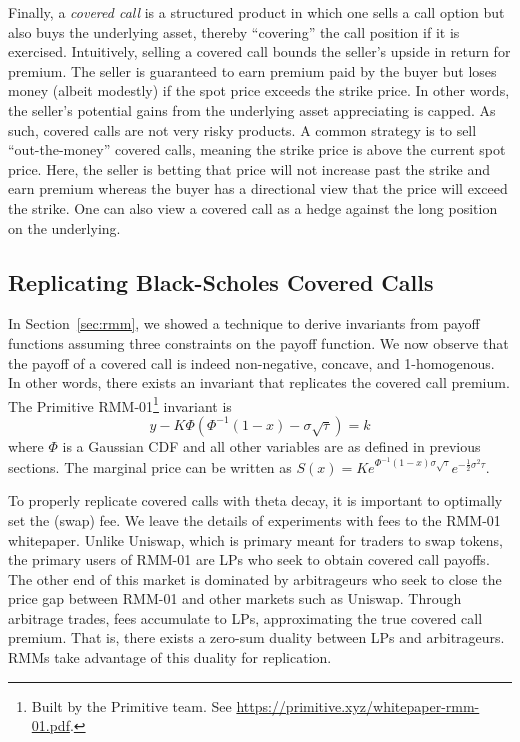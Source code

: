 \documentclass[hidelinks, 12pt]{article}
\begin{document}
Finally, a \textit{covered call} is a structured product in which one sells a call option but also buys the underlying asset, thereby ``covering'' the call position if it is exercised. Intuitively, selling a covered call bounds the seller's upside in return for premium. The seller is guaranteed to earn premium paid by the buyer but loses money (albeit modestly) if the spot price exceeds the strike price. In other words, the seller's potential gains from the underlying asset appreciating is capped. As such, covered calls are not very risky products. A common strategy is to sell ``out-the-money'' covered calls, meaning the strike price is above the current spot price. Here, the seller is betting that price will not increase past the strike and earn premium whereas the buyer has a directional view that the price will exceed the strike. One can also view a covered call as a hedge against the long position on the underlying.

\subsection{Replicating Black-Scholes Covered Calls}
\label{sec:coveredcall}

In Section~\ref{sec:rmm}, we showed a technique to derive invariants from payoff functions assuming three constraints on the payoff function. We now observe that the payoff of a covered call is indeed non-negative, concave, and 1-homogenous. In other words, there exists an invariant that replicates the covered call premium. The Primitive RMM-01\footnote{Built by the Primitive team. See \url{https://primitive.xyz/whitepaper-rmm-01.pdf}.} invariant is
\[y - K\Phi(\Phi^{-1}(1-x)-\sigma\sqrt{\tau}) = k\]
where $\Phi$ is a Gaussian CDF and all other variables are as defined in previous sections. The marginal price can be written as $S(x) = Ke^{\Phi^{-1}(1-x)\sigma\sqrt{\tau}}e^{-\frac{1}{2}\sigma^2\tau}$.

To properly replicate covered calls with theta decay, it is important to optimally set the (swap) fee. We leave the details of experiments with fees to the RMM-01 whitepaper. Unlike Uniswap, which is primary meant for traders to swap tokens, the primary users of RMM-01 are LPs who seek to obtain covered call payoffs. The other end of this market is dominated by arbitrageurs who seek to close the price gap between RMM-01 and other markets such as Uniswap. Through arbitrage trades, fees accumulate to LPs, approximating the true covered call premium. That is, there exists a zero-sum duality  between LPs and arbitrageurs. RMMs take advantage of this duality for replication.
\end{document}

